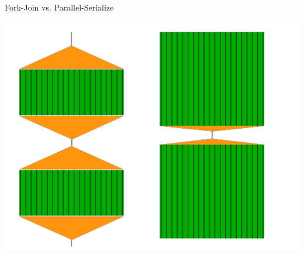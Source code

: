 \begin{frame}{Fork-Join vs. Parallel-Serialize}
  \begin{center}
    \includegraphics[scale=0.3,angle=0]{ForkJoin.pdf}
  \end{center}
\end{frame}

